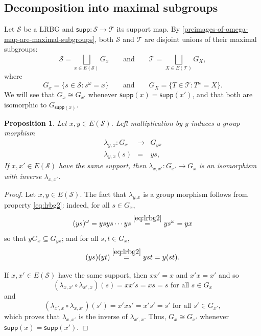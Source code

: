 \documentclass[11pt, oneside, reqno]{amsart}
\newtheorem{prop}[theorem]{Proposition}
\theoremstyle{definition}
\numberwithin{equation}{section}
\def \SS{{\mathcal{S}}}
\def \TT{{\mathcal{T}}}
\def\qqand{\qquad\text{and}\qquad}
\def \supp{\mathsf{supp}}
\begin{document}
\subsection{Decomposition into maximal subgroups}
\label{decomposition-into-maximal-subgroups}

Let $\SS$ be a LRBG and $\supp: \SS \to \TT$ its support map.
By \cref{preimages-of-omega-map-are-maximal-subgroups},
both $\SS$ and $\TT$ are disjoint unions of their maximal subgroups:
\begin{equation*}
    \SS = \bigsqcup_{x \in E(\SS)} G_x
    \qqand
    \TT = \bigsqcup_{X \in E(\TT)} G_X,
\end{equation*}
where
\begin{equation*}
    G_{x} = \{ s \in \SS : s^\omega = x \}
    \qqand
    G_{X} = \{ T \in \TT : T^\omega = X \}.
\end{equation*}
We will see that $G_{x} \cong G_{x'}$ whenever $\supp(x) = \supp(x')$,
and that both are isomorphic to $G_{\supp(x)}$.

\begin{prop}
    \label{left-multiplication-induces-group-morphism}
    Let $x, y \in E(\SS)$. Left multiplication by $y$ induces a group morphism
    \begin{eqnarray*}
        \lambda_{y,x} : G_{x} & \to & G_{yx} \\
        \lambda_{y,x}(s) & = & ys,
    \end{eqnarray*}
    If $x, x' \in E(\SS)$ have the same support, then
    $\lambda_{x,x'} : G_{x'} \to G_x$ is an isomorphism with inverse $\lambda_{x,x'}$.
\end{prop}

\begin{proof}
    Let $x, y \in E(\SS)$.
    The fact that $\lambda_{y,x}$ is a group morphism follows from property \cref{eq:lrbg2}:
    indeed, for all $s \in G_x$,
    \[
        (y s)^\omega = y s y s \cdots y s \overset{\cref{eq:lrbg2}}{=} y s^\omega = y x
    \]
    so that $y G_x \subseteq G_{yx}$; and for all $s,t \in G_x$,
    \[
        (y s) (y t) \overset{\cref{eq:lrbg2}}{=} y s t = y (st).
    \]

    If $x,x' \in E(\SS)$ have the same support,
    then $x x' = x$ and $x' x = x'$ and so
    \[
        (\lambda_{x,x'} \circ \lambda_{x',x})(s) =
        x x' s = x s = s \text{ for all } s \in G_x
    \]
    and
    \[
        (\lambda_{x',x} \circ \lambda_{x,x'})(s') =
        x' x s' = x' s' = s' \text{ for all } s' \in G_{x'},
    \]
    which proves that $\lambda_{x,x'}$ is the inverse of $\lambda_{x',x}$.
    Thus, $G_{x} \cong G_{x'}$ whenever $\supp(x) = \supp(x')$.
\end{proof}
\end{document}
